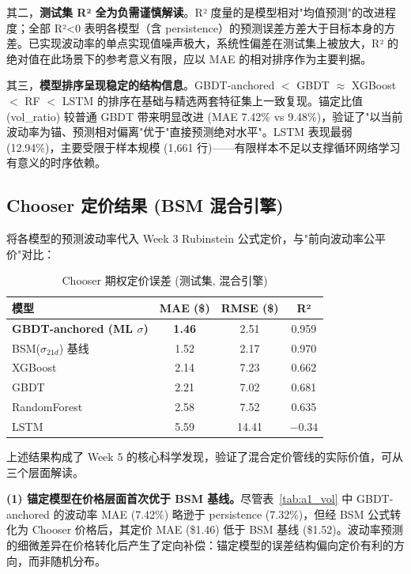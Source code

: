 \documentclass[a4paper,11pt]{article}
\begin{document}
其二，\textbf{测试集 R² 全为负需谨慎解读}。R² 度量的是模型相对"均值预测"的改进程度；全部 R²<0 表明各模型（含 persistence）的预测误差方差大于目标本身的方差。已实现波动率的单点实现值噪声极大，系统性偏差在测试集上被放大，R² 的绝对值在此场景下的参考意义有限，应以 MAE 的相对排序作为主要判据。

其三，\textbf{模型排序呈现稳定的结构信息}。GBDT-anchored $<$ GBDT $\approx$ XGBoost $<$ RF $<$ LSTM 的排序在基础与精选两套特征集上一致复现。锚定比值 (vol\_ratio) 较普通 GBDT 带来明显改进 (MAE 7.42\% vs 9.48\%)，验证了"以当前波动率为锚、预测相对偏离"优于"直接预测绝对水平"。LSTM 表现最弱 (12.94\%)，主要受限于样本规模 (1,661 行)——有限样本不足以支撑循环网络学习有意义的时序依赖。

\subsection{Chooser 定价结果 (BSM 混合引擎)}

将各模型的预测波动率代入 Week 3 Rubinstein 公式定价，与"前向波动率公平价"对比：

\begin{table}[H]
\centering
\caption{Chooser 期权定价误差 (测试集, 混合引擎)}
\label{tab:a1_price}
\begin{tabular}{lccc}
\toprule
\textbf{模型} & \textbf{MAE (\$)} & \textbf{RMSE (\$)} & \textbf{R²} \\
\midrule
\textbf{GBDT-anchored (ML $\sigma$)} & \textbf{1.46} & 2.51 & 0.959 \\
BSM($\sigma_{21d}$) 基线 & 1.52 & 2.17 & 0.970 \\
XGBoost & 2.14 & 7.23 & 0.662 \\
GBDT & 2.21 & 7.02 & 0.681 \\
RandomForest & 2.58 & 7.52 & 0.635 \\
LSTM & 5.59 & 14.41 & $-0.34$ \\
\bottomrule
\end{tabular}
\end{table}

上述结果构成了 Week 5 的核心科学发现，验证了混合定价管线的实际价值，可从三个层面解读。

\vspace{0.3cm}
\textbf{(1) 锚定模型在价格层面首次优于 BSM 基线。}尽管表~\ref{tab:a1_vol} 中 GBDT-anchored 的波动率 MAE (7.42\%) 略逊于 persistence (7.32\%)，但经 BSM 公式转化为 Chooser 价格后，其定价 MAE (\$1.46) 低于 BSM 基线 (\$1.52)。波动率预测的细微差异在价格转化后产生了定向补偿：锚定模型的误差结构偏向定价有利的方向，而非随机分布。
\end{document}
